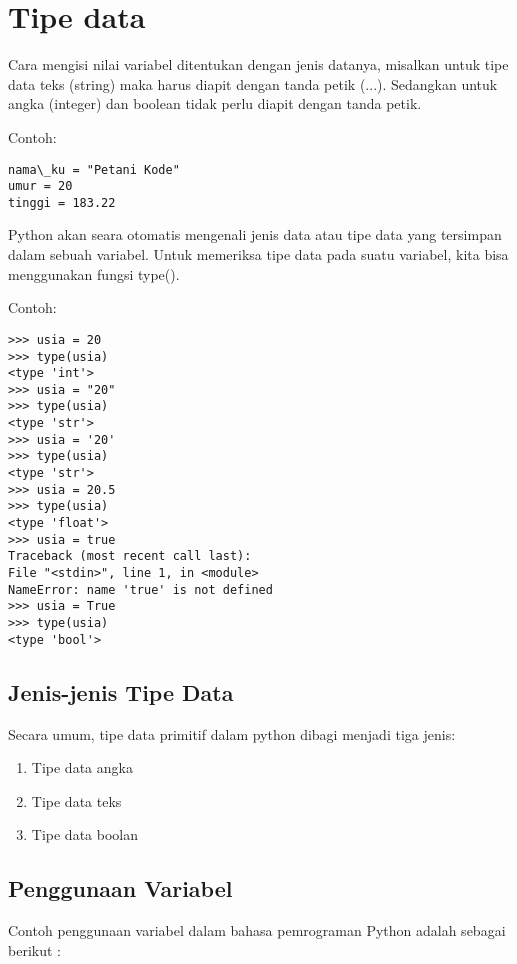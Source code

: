 \section{Tipe data}
Cara mengisi nilai variabel ditentukan dengan jenis datanya, misalkan untuk tipe data teks (string) maka harus diapit dengan tanda petik (...). Sedangkan untuk angka (integer) dan boolean tidak perlu diapit dengan tanda petik.

Contoh:

\begin{verbatim}
nama\_ku = "Petani Kode"
umur = 20
tinggi = 183.22
\end{verbatim}

Python akan seara otomatis mengenali jenis data atau tipe data yang tersimpan dalam sebuah variabel. Untuk memeriksa tipe data pada suatu variabel, kita bisa menggunakan fungsi type().

Contoh:

\begin{verbatim}
>>> usia = 20
>>> type(usia)
<type 'int'>
>>> usia = "20"
>>> type(usia)
<type 'str'>
>>> usia = '20'
>>> type(usia)
<type 'str'>
>>> usia = 20.5
>>> type(usia)
<type 'float'>
>>> usia = true
Traceback (most recent call last):
File "<stdin>", line 1, in <module>
NameError: name 'true' is not defined
>>> usia = True
>>> type(usia)
<type 'bool'>
\end{verbatim}

\subsection{Jenis-jenis Tipe Data}

Secara umum, tipe data primitif dalam python dibagi menjadi tiga jenis:

\begin{enumerate}
\item Tipe data angka
\item Tipe data teks
\item Tipe data boolan
\end{enumerate}

\subsection{Penggunaan Variabel}
Contoh penggunaan variabel  dalam bahasa pemrograman Python adalah sebagai berikut :

